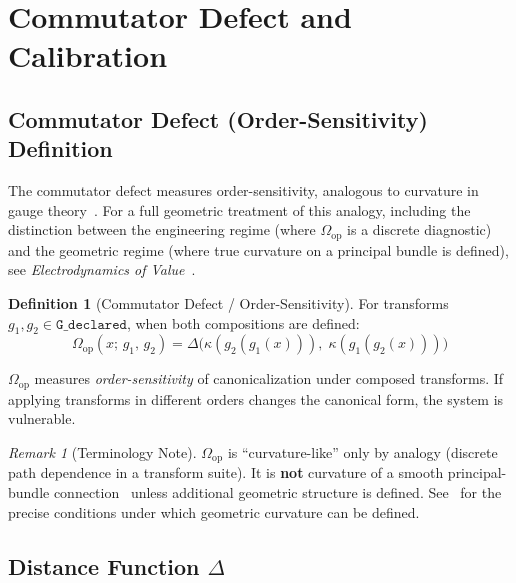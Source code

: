 \documentclass[11pt,letterpaper]{article}
\theoremstyle{definition}
\newtheorem{definition}[theorem]{Definition}
\theoremstyle{remark}
\newtheorem{remark}[theorem]{Remark}
\begin{document}

\section{Commutator Defect and Calibration}

\subsection{Commutator Defect (Order-Sensitivity) Definition}

The commutator defect measures order-sensitivity, analogous to curvature in gauge theory~\cite{nakahara2003,bleecker1981}. For a full geometric treatment of this analogy, including the distinction between the engineering regime (where $\Omega_{\mathrm{op}}$ is a discrete diagnostic) and the geometric regime (where true curvature on a principal bundle is defined), see \emph{Electrodynamics of Value}~\cite{bond2025eov}.

\begin{definition}[Commutator Defect / Order-Sensitivity]
\label{def:commutator}
For transforms $g_1, g_2 \in \texttt{G\_declared}$, when both compositions are defined:
\[
\Omega_{\mathrm{op}}(x;\, g_1,\, g_2) = \Delta\bigl(\kappa(g_2(g_1(x))),\; \kappa(g_1(g_2(x)))\bigr)
\]
\end{definition}

$\Omega_{\mathrm{op}}$ measures \emph{order-sensitivity} of canonicalization under composed transforms. If applying transforms in different orders changes the canonical form, the system is vulnerable.

\begin{remark}[Terminology Note]
$\Omega_{\mathrm{op}}$ is ``curvature-like'' only by analogy (discrete path dependence in a transform suite). It is \textbf{not} curvature of a smooth principal-bundle connection~\cite{kobayashi1963i,kobayashi1969ii} unless additional geometric structure is defined. See~\cite{bond2025eov} for the precise conditions under which geometric curvature can be defined.
\end{remark}

\subsection{Distance Function $\Delta$}
\end{document}
